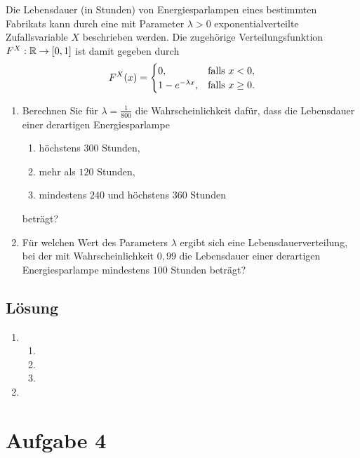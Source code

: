 \documentclass{exercise}
\begin{document}
    \begin{problem}
        Die Lebensdauer (in Stunden) von Energiesparlampen eines bestimmten Fabrikats kann durch eine mit Parameter \(\lambda > 0\) exponentialverteilte Zufallsvariable \(X\) beschrieben werden.
        Die zugehörige Verteilungsfunktion \(F^X: \R \to \brackets*{0, 1}\) ist damit gegeben durch
        \[
            F^X\parentheses*{x} = \begin{cases}
                0, &\text{falls }x < 0,\\
                1 - e^{-\lambda x}, & \text{falls }x \ge 0.
            \end{cases}
        \]
        \begin{enumerate}
            \item Berechnen Sie für \(\lambda = \frac{1}{800}\) die Wahrscheinlichkeit dafür, dass die Lebensdauer einer derartigen Energiesparlampe
            \begin{enumerate}
                \item höchstens \(300\) Stunden,
                \item mehr als \(120\) Stunden,
                \item mindestens \(240\) und höchstens \(360\) Stunden
            \end{enumerate}
            beträgt?
            \item Für welchen Wert des Parameters \(\lambda\) ergibt sich eine Lebensdauerverteilung, bei der mit Wahrscheinlichkeit \(0,99\) die Lebensdauer einer derartigen Energiesparlampe mindestens \(100\) Stunden beträgt?
        \end{enumerate}
    \end{problem}

    \subsection*{Lösung}
    \begin{enumerate}
        \item
        \begin{enumerate}
            \item
            \item
            \item
        \end{enumerate}
        \item
    \end{enumerate}


    \section*{Aufgabe 4}
\end{document}

